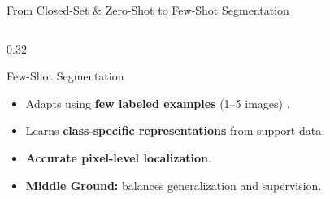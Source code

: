 \documentclass[aspectratio=169, 10pt]{beamer}
\begin{document}
\begin{frame}{From Closed-Set \& Zero-Shot to Few-Shot Segmentation}
\begin{columns}[T]
        \begin{column}{0.32\textwidth}
            \begin{exampleblock}{Few-Shot Segmentation}
                \begin{itemize}
                    \item Adapts using \textbf{few labeled examples} (1--5 images) \cite{shaban2017one}.
                    \item Learns \textbf{class-specific representations} from support data.
                    \item \textbf{Accurate pixel-level localization}.
                    \item \textbf{Middle Ground:} balances generalization and supervision.
                \end{itemize}
            \end{exampleblock}
        \end{column}
    \end{columns}
\end{frame}
\end{document}

